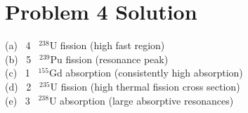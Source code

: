 \section*{Problem 4 Solution}

\tab\tab (a) \, 4 \, $^{238}$U fission (high fast region) 					\\
\tab\tab (b) \, 5 \, $^{239}$Pu fission (resonance peak)					\\
\tab\tab (c) \, 1 \, $^{155}$Gd absorption (consistently high absorption)	\\
\tab\tab (d) \, 2 \, $^{235}$U fission (high thermal fission cross section)	\\
\tab\tab (e) \, 3 \, $^{238}$U absorption (large absorptive resonances) 

